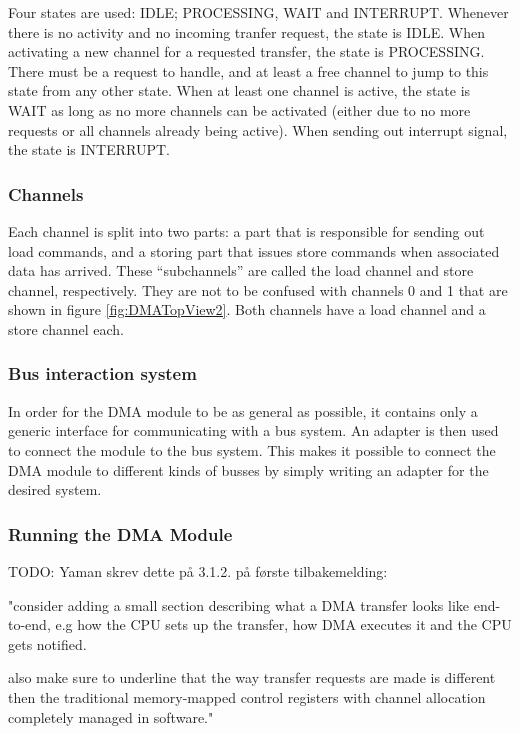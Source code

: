 Four states are used: IDLE; PROCESSING, WAIT and INTERRUPT.
Whenever there is no activity and no incoming tranfer request, the state is IDLE.
When activating a new channel for a requested transfer, the state is PROCESSING. 
There must be a request to handle, and at least a free channel to jump to this state from any other state.
When at least one channel is active, the state is WAIT as long as no more channels can be activated (either due to no more requests or all channels already being active).
When sending out interrupt signal, the state is INTERRUPT.

\subsubsection{Channels}
Each channel is split into two parts: a part that is responsible for sending out load
commands, and a storing part that issues store commands when associated data has arrived. 
These ``subchannels'' are called the load channel and store channel, respectively.
They are not to be confused with channels 0 and 1 that are shown in figure \ref{fig:DMATopView2}.
Both channels have a load channel and a store channel each.

\subsubsection{Bus interaction system}
In order for the DMA module to be as general as possible, it contains only a generic
interface for communicating with a bus system. An adapter is then used to connect
the module to the bus system. This makes it possible to connect the DMA module to
different kinds of busses by simply writing an adapter for the desired system.

\subsubsection{Running the DMA Module}
TODO:
Yaman skrev dette på 3.1.2. på første tilbakemelding:

"consider adding a small section describing what a DMA transfer looks like end-to-end, e.g how the CPU sets up the transfer, how DMA executes it and the CPU gets notified. 

also make sure to underline that the way transfer requests are made is different then the traditional memory-mapped control registers with channel allocation completely managed in software."
